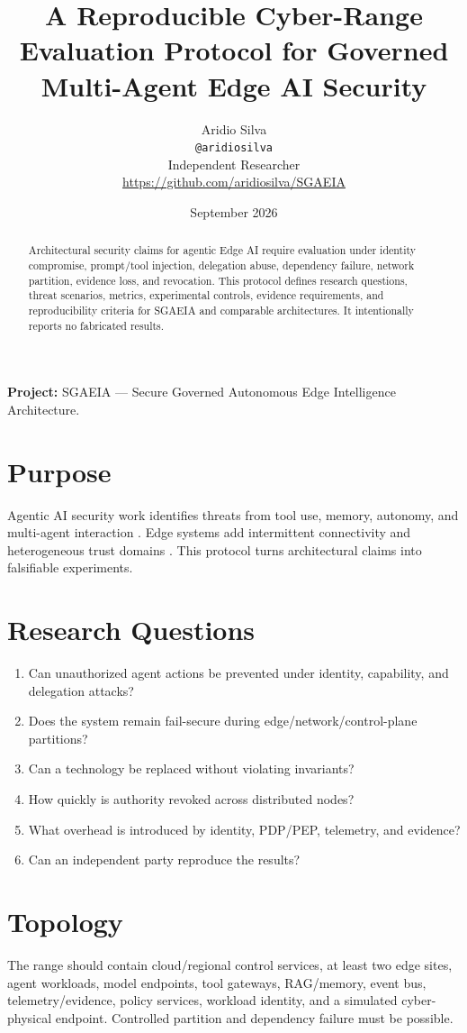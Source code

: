 \documentclass[11pt]{article}
\author{Aridio Silva\\\texttt{@aridiosilva}\\Independent Researcher\\\url{https://github.com/aridiosilva/SGAEIA}}
\date{September 2026}
\title{A Reproducible Cyber-Range Evaluation Protocol for Governed Multi-Agent Edge AI Security}
\begin{document}
\maketitle
\begin{abstract}
Architectural security claims for agentic Edge AI require evaluation under identity compromise, prompt/tool injection, delegation abuse, dependency failure, network partition, evidence loss, and revocation. This protocol defines research questions, threat scenarios, metrics, experimental controls, evidence requirements, and reproducibility criteria for SGAEIA and comparable architectures. It intentionally reports no fabricated results.
\end{abstract}
\noindent\textbf{Project:} SGAEIA --- Secure Governed Autonomous Edge Intelligence Architecture.\\

\section{Purpose}
Agentic AI security work identifies threats from tool use, memory, autonomy, and multi-agent interaction \cite{datta2025,owasp,mitreatlas}. Edge systems add intermittent connectivity and heterogeneous trust domains \cite{shi2016edge,etsi}. This protocol turns architectural claims into falsifiable experiments.

\section{Research Questions}
\begin{enumerate}
\item Can unauthorized agent actions be prevented under identity, capability, and delegation attacks?
\item Does the system remain fail-secure during edge/network/control-plane partitions?
\item Can a technology be replaced without violating invariants?
\item How quickly is authority revoked across distributed nodes?
\item What overhead is introduced by identity, PDP/PEP, telemetry, and evidence?
\item Can an independent party reproduce the results?
\end{enumerate}

\section{Topology}
The range should contain cloud/regional control services, at least two edge sites, agent workloads, model endpoints, tool gateways, RAG/memory, event bus, telemetry/evidence, policy services, workload identity, and a simulated cyber-physical endpoint. Controlled partition and dependency failure must be possible.
\end{document}
